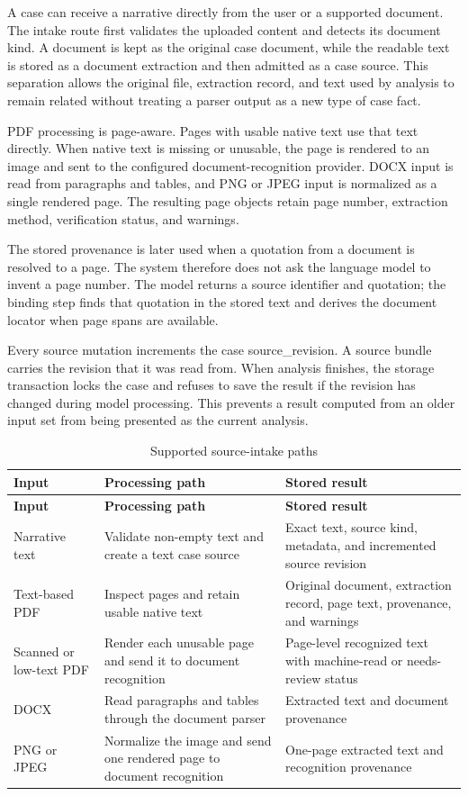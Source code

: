 A case can receive a narrative directly from the user or a supported document. The intake route first validates the uploaded content and detects its document kind. A document is kept as the original case document, while the readable text is stored as a document extraction and then admitted as a case source. This separation allows the original file, extraction record, and text used by analysis to remain related without treating a parser output as a new type of case fact.

PDF processing is page-aware. Pages with usable native text use that text directly. When native text is missing or unusable, the page is rendered to an image and sent to the configured document-recognition provider. DOCX input is read from paragraphs and tables, and PNG or JPEG input is normalized as a single rendered page. The resulting page objects retain page number, extraction method, verification status, and warnings.

The stored provenance is later used when a quotation from a document is resolved to a page. The system therefore does not ask the language model to invent a page number. The model returns a source identifier and quotation; the binding step finds that quotation in the stored text and derives the document locator when page spans are available.

Every source mutation increments the case source\_revision. A source bundle carries the revision that it was read from. When analysis finishes, the storage transaction locks the case and refuses to save the result if the revision has changed during model processing. This prevents a result computed from an older input set from being presented as the current analysis.

\begin{longtable}{@{}>{\raggedright\arraybackslash}p{} >{\raggedright\arraybackslash}p{} >{\raggedright\arraybackslash}p{}@{}}
\caption{Supported source-intake paths}\label{tab:4-3}\\
\toprule
\textbf{Input} & \textbf{Processing path} & \textbf{Stored result} \\
\midrule
\endfirsthead
\textbf{Input} & \textbf{Processing path} & \textbf{Stored result} \\
\midrule
\endhead
Narrative text & Validate non-empty text and create a text case source & Exact text, source kind, metadata, and incremented source revision \\
Text-based PDF & Inspect pages and retain usable native text & Original document, extraction record, page text, provenance, and warnings \\
Scanned or low-text PDF & Render each unusable page and send it to document recognition & Page-level recognized text with machine-read or needs-review status \\
DOCX & Read paragraphs and tables through the document parser & Extracted text and document provenance \\
PNG or JPEG & Normalize the image and send one rendered page to document recognition & One-page extracted text and recognition provenance \\
\bottomrule
\end{longtable}

